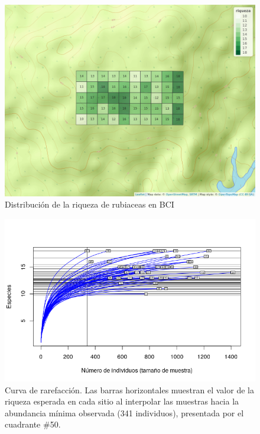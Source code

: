 \documentclass[11pt,]{article}
\begin{document}
\begin{figure}
\centering
\includegraphics{mapa_cuadros_riq_rubic.png}
\caption{Distribución de la riqueza de rubiaceas en BCI
\label{fig:mapa_cuadros_riq}}
\end{figure}

\begin{figure}
\centering
\includegraphics{rarefaccion_min_abun.png}
\caption{Curva de rarefacción. Las barras horizontales muestran el valor
de la riqueza esperada en cada sitio al interpolar las muestras hacia la
abundancia mínima observada (341 individuos), presentada por el
cuadrante \#50. \label{fig:rarefaccion_min_abun}}
\end{figure}
\end{document}
